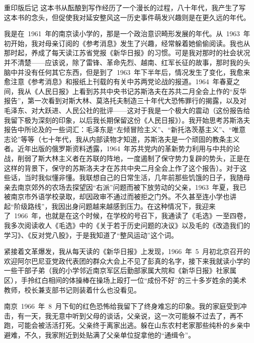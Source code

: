 
\begin{pre-post-text}{重印版后记}
这本书从酝酿到写作经历了一个漫长的过程，八十年代，我产生了写这本书的念头，但促使我对延安整风这一历史事件萌发兴趣则是在更久远的年代。

我是在~1961~年的南京读小学的，那是一个政治意识畸形发展的年代。从~1963~年初开始，我对母亲订阅的《参考消息》发生了兴趣，经常躲着她偷偷阅读。我也从那时起，养成了每天读江苏省党报《新华日报》的习惯。可是我对那时的社会状况并不清楚——应该说，除了雷锋、革命先烈、越南、红军长征的故事，那时我的头脑中并没有任何其它东西，但是到了~1963~年下半年后，情况发生了变化，我愈来愈注意《参考消息》和报纸上刊载的有关中苏两党论战的报道。1964~年春夏之间，我从《人民日报》上看到苏共中央书记苏斯洛夫在苏共二月全会上作的“反华报告”，第一次看到对斯大林、莫洛托夫制造三十年代大恐怖罪行的揭露，以及对毛泽东、对大跃进、人民公社的批评——这对于我是一个极大的震动（这份报告给我留下极为深刻的印象，以后我长期保留这份《人民日报》）。我开始思考苏斯洛夫报告中所论及的一些词汇：毛泽东是“左倾冒险主义”、“新托洛茨基主义”、“唯意志论”等等（七十年代，我从内部读物才知道，苏斯洛夫是一个顽固的教条主义者。近年出版的俄罗斯资料透露，1964~年苏共党内的革新势力利用与中共的论战，削弱了斯大林主义者在苏联的阵地，一度遏制了保守势力复辟的势头，正是在这样的背景下，保守的苏斯洛夫才在苏共中央二月全会上作了这个报告）。对于这些话，当时我似懂非懂。我联想自己的日常生活，几年前那些饥饿的日子，我随母亲去南京郊外的农场去探望因“右派”问题而被下放劳动的父亲，1963~年夏，我已被南京市外语学校录取，却因政审不通过而被拒之门外。不久甚至连小学也讲起“阶级路线”，我因出身问题越来越感到压力。在这种情况下，我迎来了~1966~年，也就是在这个时候，在学校的号召下，我通读了《毛选》一至四卷，我多次阅读收人《毛选》中的《关于若于历史问题的决议》以及毛的《改造我们的学习》、《反对党八股》，于是我知道了“整风运动”这个词。

紧接着文革爆发，我从每天读的《新华日报》上发现，1966~年~5~月初北京召开的欢迎阿尔巴尼亚党政代表团的群众大会上不见了彭真的名字，接下来我就读小学的一些干部子弟（我的小学邻近南京军区后勤部家属大院和《新华日报》社家属区），手拎红白相间的体操棒在操场上殴打一位“成份不好”的三十多岁姓余的美术教师，校长兼支部书记则装着什么也没看见。

南京~1966~年~8~月下旬的红色恐怖给我留下了终身难忘的印象。我的家庭受到冲击，有一天，我无意中听到父母的谈话，父亲说，这一次可能躲不过去了，再不跑，可能会被活活打死。父亲终于离家出逃。躲在山东农村老家那些纯朴的乡亲中避难，不久，我家附近到处贴满了父亲单位捉拿他的“通缉令”。


\end{pre-post-text}
